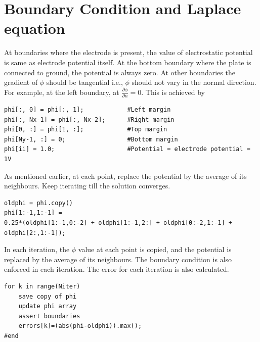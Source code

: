 \documentclass[12pt, a4paper]{report}
\begin{document}
\section*{Boundary Condition and Laplace equation}

At boundaries where the electrode is present, the value of electrostatic potential is same as electrode potential itself. At the bottom boundary where the plate is connected to ground, the potential is always zero. At other boundaries the gradient of $\phi$ should be tangential i.e., $\phi$ should not vary in the normal direction. For example, at the left boundary, at $\frac{\partial \phi}{\partial n} = 0$. This is achieved by

\begin{verbatim}
phi[:, 0] = phi[:, 1];            #Left margin              
phi[:, Nx-1] = phi[:, Nx-2];      #Right margin
phi[0, :] = phi[1, :];            #Top margin
phi[Ny-1, :] = 0;                 #Bottom margin
phi[ii] = 1.0;                    #Potential = electrode potential = 1V
\end{verbatim}

As mentioned earlier, at each point, replace the potential by the average of its neighbours. Keep iterating till the solution converges.
\begin{verbatim}
oldphi = phi.copy()
phi[1:-1,1:-1] = 
0.25*(oldphi[1:-1,0:-2] + oldphi[1:-1,2:] + oldphi[0:-2,1:-1] + oldphi[2:,1:-1]);
\end{verbatim}

In each iteration, the $\phi$ value at each point is copied, and the potential is replaced by the average of its neighbours. The boundary condition is also enforced in each iteration. The error for each iteration is also calculated.
\begin{verbatim}
for k in range(Niter)
    save copy of phi
    update phi array
    assert boundaries
    errors[k]=(abs(phi-oldphi)).max();
#end
\end{verbatim}
\end{document}
